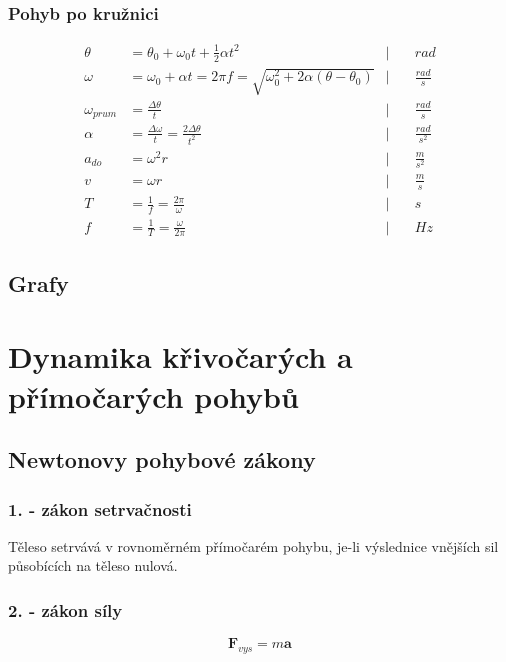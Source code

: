 \documentclass[titlepage]{book}
\begin{document}
\subsection{Pohyb po kružnici}
\begin{align}
\theta &= \theta_0 + \omega_0t+\frac{1}{2}\alpha t^2                                     &  \Big| \quad &rad\\
\omega &= \omega_0 + \alpha t = 2 \pi f  = \sqrt{\omega_0^2 + 2\alpha(\theta-\theta_0)}  &  \Big| \quad &\frac{rad}{s}\\
\omega_{prum} &= \frac{\Delta \theta}{t}                                                 &  \Big| \quad &\frac{rad}{s}\\
\alpha &= \frac{\Delta \omega}{t} = \frac{2\Delta \theta}{t^2}                           &  \Big| \quad &\frac{rad}{s^2}\\
a_{do} &= \omega^2r                                                                      &  \Big| \quad &\frac{m}{s^2}\\
v &= \omega r                                                                            &  \Big| \quad &\frac{m}{s}\\
T &= \frac{1}{f} = \frac{2\pi}{\omega}                                                   &  \Big| \quad &s\\
f &= \frac{1}{T} = \frac{\omega}{2\pi}                                                   &  \Big| \quad &Hz
\end{align}
\section{Grafy}
\chapter{Dynamika křivočarých a přímočarých pohybů}
\section{Newtonovy pohybové zákony}
\subsection{1. - zákon setrvačnosti}
Těleso setrvává v rovnoměrném přímočarém pohybu, je-li výslednice vnějších sil působících na těleso nulová.
\subsection{2. - zákon síly}
\begin{equation}
\boldsymbol F_{vys} = m\boldsymbol a
\end{equation}
\end{document}
